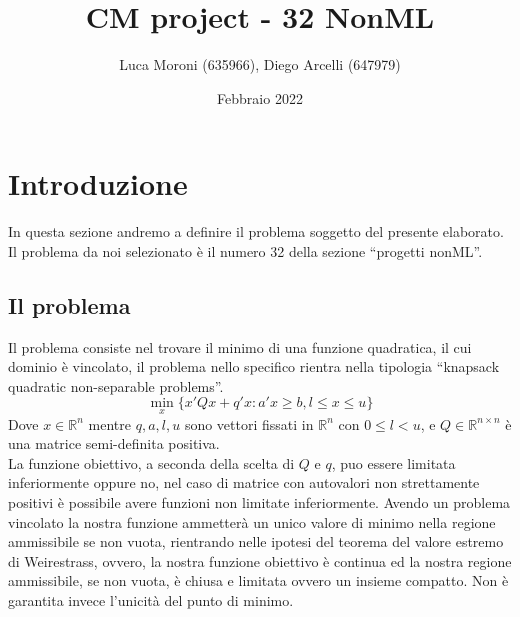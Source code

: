 \documentclass[12pt]{extarticle}
\title{CM project - 32 NonML}
\author{Luca Moroni (635966), Diego Arcelli (647979)}
\date{Febbraio 2022}
\newcommand{\quotes}[1]{``#1''}
\begin{document}
\maketitle

\section{Introduzione}
In questa sezione andremo a definire il problema soggetto del presente elaborato. Il problema da noi selezionato è il numero 32 della sezione   \quotes{progetti nonML}.
\subsection{Il problema}
Il problema consiste nel trovare il minimo di una funzione quadratica, il cui dominio è vincolato, il problema nello specifico rientra nella tipologia \quotes{knapsack quadratic non-separable problems}.\\
\[\min_x \{x'Qx + q'x : a'x \geq b, l \leq x \leq u\}\]
Dove $x \in \mathbb{R}^n$ mentre $q, a, l, u$  sono vettori fissati in $\mathbb{R}^n$ con $0 \leq l < u$, e $Q \in \mathbb{R}^{n \times n}$ è una matrice semi-definita positiva.\\
La funzione obiettivo, a seconda della scelta di $Q$ e $q$, puo essere limitata inferiormente oppure no, nel caso di matrice con autovalori non strettamente positivi è possibile avere funzioni non limitate inferiormente. Avendo un problema vincolato la nostra funzione ammetterà un unico valore di minimo nella regione ammissibile se non vuota, rientrando nelle ipotesi del teorema del valore estremo di Weirestrass, ovvero, la nostra funzione obiettivo è continua ed la nostra regione ammissibile, se non vuota, è chiusa e limitata ovvero un insieme compatto. Non è garantita invece l'unicità del punto di minimo.
\end{document}
